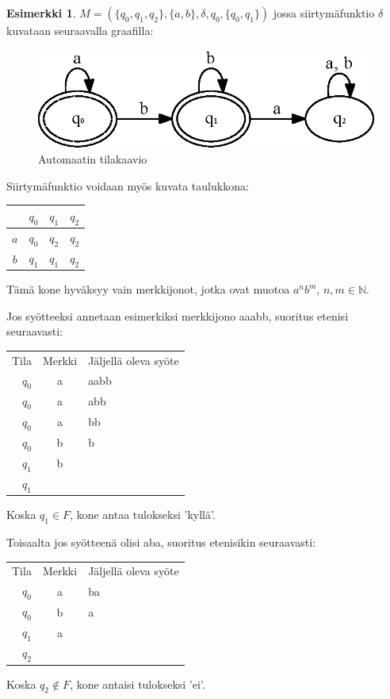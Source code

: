 \documentclass[a4paper, 12pt]{article}
\theoremstyle{definition}
\newtheorem{example}[mydef]{Esimerkki}
\theoremstyle{plain}
\begin{document}
\begin{example}
$M = (\{q_0, q_1, q_2\}, \{a, b\}, \delta, q_0, \{q_0, q_1\})$ jossa siirtymäfunktio $\delta$ kuvataan seuraavalla graafilla:

\begin{figure}[H]
\centering
\includegraphics{graph2.eps}
\caption{Automaatin tilakaavio}
\end{figure}

Siirtymäfunktio voidaan myös kuvata taulukkona:
\\
\begin{center}
\begin{tabular} {c | c c c}
& $q_0$ & $q_1$ & $q_2$ \\
\hline
$a$ & $q_0$ & $q_2$ & $q_2$ \\
$b$ & $q_1$ & $q_1$ & $q_2$ \\
\end{tabular}
\end{center}

Tämä kone hyväksyy vain merkkijonot, jotka ovat muotoa $a^nb^m$, $n, m \in \mathbb{N}$.

Jos syötteeksi annetaan esimerkiksi merkkijono aaabb, suoritus etenisi seuraavasti:\\

\begin{center}
\begin{tabular}{r c l }
Tila & Merkki & Jäljellä oleva syöte \\
$q_0$ & a & aabb \\
$q_0$ & a & abb \\
$q_0$ & a & bb \\
$q_0$ & b & b \\
$q_1$ & b & \\
$q_1$ & & \\
\end{tabular}
\end{center}

Koska $q_1 \in F$, kone antaa tulokseksi 'kyllä'.

Toisaalta jos syötteenä olisi aba, suoritus etenisikin seuraavasti:
\\
\begin{center}
\begin{tabular}{r c l }
Tila & Merkki & Jäljellä oleva syöte \\
$q_0$ & a & ba \\
$q_0$ & b & a \\
$q_1$ & a &  \\
$q_2$ & & \\
\end{tabular}
\end{center}

Koska $q_2 \notin F$, kone antaisi tulokseksi 'ei'.
\end{example}
\end{document}
